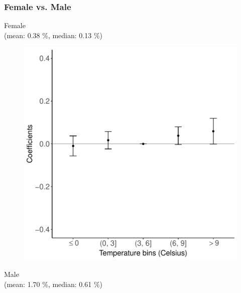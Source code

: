 \documentclass[9pt, pdfmx,hiresbb]{beamer}
\begin{document}
\begin{frame}\frametitle{Female vs. Male}
  \begin{minipage}{0.49\textwidth}
    \begin{center}
      Female \\
      (mean: 0.38 \%, median: 0.13 \%)
    \end{center}
    \begin{figure}[h]
      \centering
      \includegraphics[width = \textwidth]{../Output/images/reg_gender_2.pdf}
    \end{figure}
  \end{minipage}
  \begin{minipage}{0.49\textwidth}
    \begin{center}
      Male \\
      (mean: 1.70 \%, median: 0.61 \%)
    \end{center}
    \begin{figure}[h]

\end{figure}
\end{minipage}
\end{frame}
\end{document}
